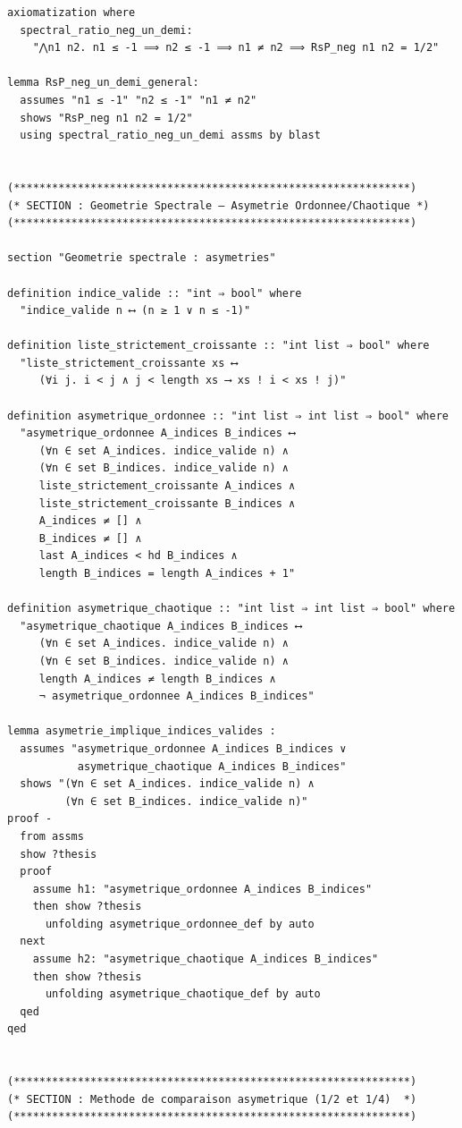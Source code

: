 \documentclass[a4paper,11pt]{article}
\begin{document}
\begin{holcode}[title={\textcolor{white}{Fichier : methode\_spectral.thy -- Partie 3/4}}]
\begin{lstlisting}
axiomatization where
  spectral_ratio_neg_un_demi:
    "⋀n1 n2. n1 ≤ -1 ⟹ n2 ≤ -1 ⟹ n1 ≠ n2 ⟹ RsP_neg n1 n2 = 1/2"

lemma RsP_neg_un_demi_general:
  assumes "n1 ≤ -1" "n2 ≤ -1" "n1 ≠ n2"
  shows "RsP_neg n1 n2 = 1/2"
  using spectral_ratio_neg_un_demi assms by blast


(**************************************************************)
(* SECTION : Geometrie Spectrale — Asymetrie Ordonnee/Chaotique *)
(**************************************************************)

section "Geometrie spectrale : asymetries"

definition indice_valide :: "int ⇒ bool" where
  "indice_valide n ⟷ (n ≥ 1 ∨ n ≤ -1)"

definition liste_strictement_croissante :: "int list ⇒ bool" where
  "liste_strictement_croissante xs ⟷
     (∀i j. i < j ∧ j < length xs ⟶ xs ! i < xs ! j)"

definition asymetrique_ordonnee :: "int list ⇒ int list ⇒ bool" where
  "asymetrique_ordonnee A_indices B_indices ⟷
     (∀n ∈ set A_indices. indice_valide n) ∧
     (∀n ∈ set B_indices. indice_valide n) ∧
     liste_strictement_croissante A_indices ∧
     liste_strictement_croissante B_indices ∧
     A_indices ≠ [] ∧
     B_indices ≠ [] ∧
     last A_indices < hd B_indices ∧
     length B_indices = length A_indices + 1"

definition asymetrique_chaotique :: "int list ⇒ int list ⇒ bool" where
  "asymetrique_chaotique A_indices B_indices ⟷
     (∀n ∈ set A_indices. indice_valide n) ∧
     (∀n ∈ set B_indices. indice_valide n) ∧
     length A_indices ≠ length B_indices ∧
     ¬ asymetrique_ordonnee A_indices B_indices"

lemma asymetrie_implique_indices_valides :
  assumes "asymetrique_ordonnee A_indices B_indices ∨
           asymetrique_chaotique A_indices B_indices"
  shows "(∀n ∈ set A_indices. indice_valide n) ∧
         (∀n ∈ set B_indices. indice_valide n)"
proof -
  from assms
  show ?thesis
  proof
    assume h1: "asymetrique_ordonnee A_indices B_indices"
    then show ?thesis
      unfolding asymetrique_ordonnee_def by auto
  next
    assume h2: "asymetrique_chaotique A_indices B_indices"
    then show ?thesis
      unfolding asymetrique_chaotique_def by auto
  qed
qed


(**************************************************************)
(* SECTION : Methode de comparaison asymetrique (1/2 et 1/4)  *)
(**************************************************************)


\end{lstlisting}
\end{holcode}
\end{document}
